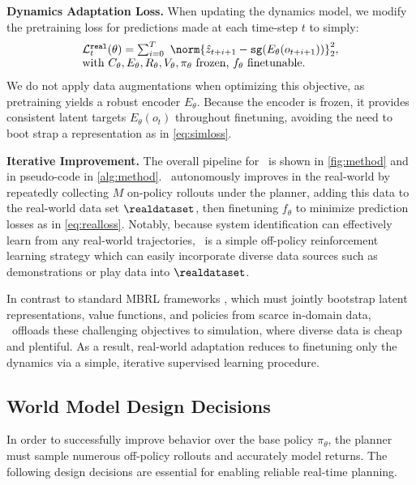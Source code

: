 \textbf{Dynamics Adaptation Loss.} When updating the dynamics model, we modify the pretraining loss for predictions made at each time-step $t$ to simply: 
\begin{equation}
\label{eq:realloss}
\begin{array}{l}
    \mathcal{L}_t^{\mathtt{real}}(\theta) = \sum_{i=0}^{T} \,\, \norm{\hat{z}_{t+i+1} - \mathtt{sg}(E_{\theta}(o_{t+i+1}))}^2_2, \\
    \text{with } C_\theta, E_\theta, R_\theta, V_\theta, \pi_\theta \ \text{frozen, } f_{\theta} \text{ finetunable}. 
\end{array}
\end{equation}
We do not apply data augmentations when optimizing this objective, as pretraining yields a robust encoder $E_\theta$. Because the encoder is frozen, it provides consistent latent targets 
$E_\theta(o_t)$ throughout finetuning, avoiding the need to boot strap a representation as in \eqref{eq:simloss}. 



\textbf{Iterative Improvement.} The overall pipeline for \Method \ is shown in \cref{fig:method} and in pseudo-code in \cref{alg:method}. \Method \ autonomously improves in the real-world by repeatedly collecting $M$ on-policy rollouts under the planner, adding this data to the real-world data set $\realdataset$, then finetuning $f_\theta$ to minimize prediction losses as in \eqref{eq:realloss}. Notably, because system identification can effectively learn from any real-world trajectories, \Method \ is a simple off-policy reinforcement learning strategy which can easily incorporate diverse data sources such as demonstrations or play data into $\realdataset$.

\begin{remark}
In contrast to standard MBRL frameworks \cite{hafnerdream,hansen2022temporal}, which must jointly bootstrap latent representations, value functions, and policies from scarce in-domain data, \Method\ offloads these challenging objectives to simulation, where diverse data is cheap and plentiful. As a result, real-world adaptation reduces to finetuning only the dynamics via a simple, iterative supervised learning procedure.
\end{remark}
\subsection{World Model Design Decisions}
\label{sec:modeldetails}

In order to successfully improve behavior over the base policy $\pi_\theta$, the planner must sample numerous off-policy rollouts and accurately model returns. The following design decisions are essential for enabling reliable real-time planning. 

